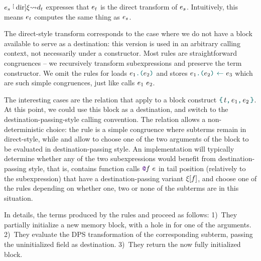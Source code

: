 $\datalangExpr_s \tmcDir{\datalangRenaming} \datalangDef_t$ expresses that $\datalangExpr_t$ is the direct transform of $\datalangExpr_s$.
Intuitively, this means $\datalangExpr_t$ computes the same thing as $\datalangExpr_s$.

The direct-style transform corresponds to the case where we do not have a block available to serve as a destination: this version is used in an arbitrary calling context, not necessarily under a constructor. Most rules are straightforward congruences -- we recursively transform subexpressions and preserve the term constructor. We omit the rules for loads $\datalangLoad{\datalangExpr_1}{\datalangExpr_2}$ and stores $\datalangStore{\datalangExpr_1}{\datalangExpr_2}{\datalangExpr_3}$ which are such simple congruences, just like calls $\datalangCall {\datalangExpr_1} {\datalangExpr_2}$. 

The interesting cases are the relation that apply to a block construct $\datalangBlock \datalangTag {\datalangExpr_1} {\datalangExpr_2}$. At this point, we could use this block as a destination, and switch to the destination-passing-style calling convention. The relation allows a non-deterministic choice: the rule  is a simple congruence where subterms remain in direct-style, while  and  allow to choose one of the two arguments of the block to be evaluated in destination-passing style. An implementation will typically determine whether any of the two subexpressions would benefit from destination-passing style, that is, contains function calls $\datalangCall {\datalangFnptr \datalangFn} \datalangExpr$ in tail position (relatively to the subexpression) that have a destination-passing variant $\datalangRenaming [\datalangFn]$, and choose one of the rules depending on whether one, two or none of the subterms are in this situation.

In details, the terms produced by the rules  and  proceed as follows:
1)~They partially initialize a new memory block, with a hole in for one of the arguments.
2)~They evaluate the DPS transformation of the corresponding subterm, passing the uninitialized field as destination.
3)~They return the now fully initialized block.




